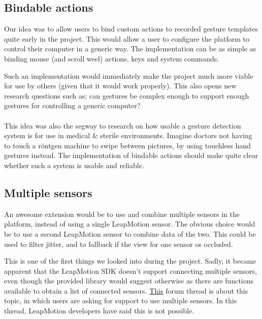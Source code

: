\documentclass[a4paper]{article}
\begin{document}
  \subsection*{Bindable actions}
  Our idea was to allow users to bind custom actions to recorded gesture
  templates quite early in the project. This would allow a user to configure the
  platform to control their computer in a generic way. The implementation can be
  as simple as binding mouse (and scroll weel) actions, keys and system commands.

  Such an implementation would immediately make the project much more viable for
  use by others (given that it would work properly). This also opens new
  research questions such as; can gestures be complex enough to support enough
  gestures for controlling a generic computer?

  \paragraph{}
  This idea was also the segway to research on how usable a gesture detection
  system is for use in medical \& sterile environments. Imagine doctors not
  having to touch a röntgen machine to swipe between pictures, by using
  touchless hand gestures instead. The implementation of bindable actions
  should make quite clear whether such a system is usable and reliable.

  \subsection*{Multiple sensors}
  An awesome extension would be to use and combine multiple sensors in the
  platform, instead of using a single LeapMotion sensor. The obvious choice
  would be to use a second LeapMotion sensor to combine data of the two. This
  could be used to filter jitter, and to fallback if the view for one sensor os
  occluded.

  This is one of the first things we looked into during the project. Sadly, it
  became apparent that the LeapMotion SDK doesn't support connecting multiple
  sensors, even though the provided library would suggest otherwise as there are
  functions available to obtain a list of connected sensors.
  \href{https://forums.leapmotion.com/t/multiple-leap-motion-support/770}{This}
  forum thread is about this topic, in which users are asking for support to use
  multiple sensors. In this thread, LeapMotion developers have said this is not
  possible.
\end{document}
